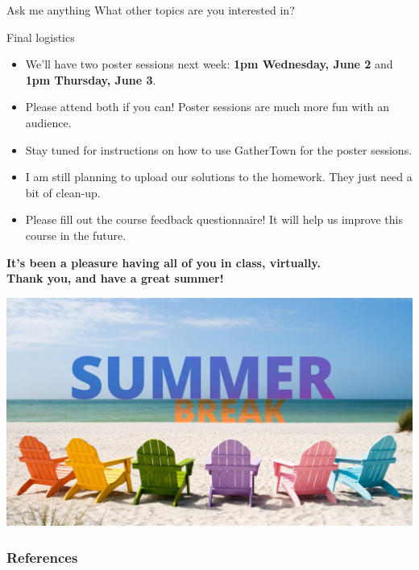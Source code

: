 \documentclass[aspectratio=169]{beamer}
\begin{document}
\begin{frame}[t]{Ask me anything}
What other topics are you interested in?
\end{frame}

\begin{frame}{Final logistics}
    
\begin{itemize}
    \item We'll have two poster sessions next week: \textbf{1pm Wednesday, June 2} and \textbf{1pm Thursday, June 3}.
    \item Please attend both if you can! Poster sessions are much more fun with an audience.
    \item Stay tuned for instructions on how to use GatherTown for the poster sessions.
    \item I am still planning to upload our solutions to the homework. They just need a bit of clean-up. 
    \item Please fill out the course feedback questionnaire! It will help us improve this course in the future.
\end{itemize}
\end{frame}

\begin{frame}{}
\centering
\Large \textbf{It's been a pleasure having all of you in class, virtually.\\ Thank you, and have a great summer!}

\includegraphics[width=.8\textwidth]{figures/lap9/summer.jpeg}
\end{frame}

\begin{frame}[t,allowframebreaks]
        \frametitle{References}
        
        
\end{frame}
\end{document}
